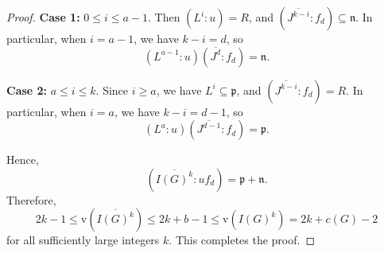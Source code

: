 \documentclass[11pt,reqno,a4paper]{amsart}
\theoremstyle{definition}
\begin{document}
\begin{proof}
\noindent \textbf{Case 1:} \(0 \le i \le a-1\). Then \((L^i : u) = R\), and \((\overline{J^{k-i}} : f_d) \subseteq \mathfrak{n}\). In particular, when \(i = a-1\), we have \(k-i = d\), so
\[
(L^{a-1} : u)(\overline{J^d} : f_d) = \mathfrak{n}.
\]

\noindent \textbf{Case 2:} \(a \le i \le k\). Since \(i \ge a\), we have \(L^i \subseteq \mathfrak{p}\), and \((\overline{J^{k-i}} : f_d) = R\). In particular, when \(i = a\), we have \(k-i = d-1\), so
\[
(L^a : u)(\overline{J^{d-1}} : f_d) = \mathfrak{p}.
\]

\noindent Hence,
\[
(\overline{I(G)^k} : u f_d) = \mathfrak{p} + \mathfrak{n}.
\]
Therefore,
\[
2k - 1 \le \mathrm{v}(\overline{I(G)^k}) \le 2k + b - 1 \le \mathrm{v}(I(G)^k) = 2k + c(G) - 2
\]
for all sufficiently large integers \(k\).
This completes the proof.


\end{proof}
\end{document}
